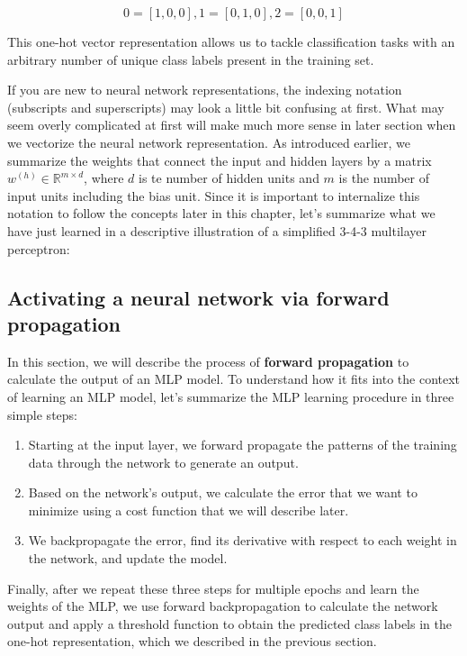 \documentclass[11pt]{article}
\providecommand{\tightlist}{%
      \setlength{\itemsep}{0pt}\setlength{\parskip}{0pt}}
\begin{document}
\[0 = [1, 0, 0], 1 = [0, 1, 0], 2 = [0, 0, 1]\]

This one-hot vector representation allows us to tackle classification
tasks with an arbitrary number of unique class labels present in the
training set.

If you are new to neural network representations, the indexing notation
(subscripts and superscripts) may look a little bit confusing at first.
What may seem overly complicated at first will make much more sense in
later section when we vectorize the neural network representation. As
introduced earlier, we summarize the weights that connect the input and
hidden layers by a matrix \(w^{(h)} \in \mathbb{R}^{m \times d}\), where
\(d\) is te number of hidden units and \(m\) is the number of input
units including the bias unit. Since it is important to internalize this
notation to follow the concepts later in this chapter, let's summarize
what we have just learned in a descriptive illustration of a simplified
3-4-3 multilayer perceptron:

    \subsection{Activating a neural network via forward
propagation}\label{activating-a-neural-network-via-forward-propagation}

    In this section, we will describe the process of \textbf{forward
propagation} to calculate the output of an MLP model. To understand how
it fits into the context of learning an MLP model, let's summarize the
MLP learning procedure in three simple steps:

\begin{enumerate}
\def\labelenumi{\arabic{enumi}.}
\tightlist
\item
  Starting at the input layer, we forward propagate the patterns of the
  training data through the network to generate an output.
\item
  Based on the network's output, we calculate the error that we want to
  minimize using a cost function that we will describe later.
\item
  We backpropagate the error, find its derivative with respect to each
  weight in the network, and update the model.
\end{enumerate}

Finally, after we repeat these three steps for multiple epochs and learn
the weights of the MLP, we use forward backpropagation to calculate the
network output and apply a threshold function to obtain the predicted
class labels in the one-hot representation, which we described in the
previous section.
\end{document}
